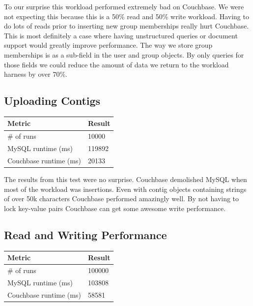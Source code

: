 \documentclass[]{IEEEtran}
\begin{document}
To our surprise this workload performed extremely bad on Couchbase. We were not expecting this because this is a 50\% read
and 50\% write workload. Having to do lots of reads prior to inserting new group memberships really hurt Couchbase. This is most definitely 
a case where having unstructured queries or document support would greatly improve performance. The way we store group memberships
is as a sub-field in the user and group objects. By only queries for those fields we could reduce the amount of data we return to the workload harness by over 70\%.

\subsection{Uploading Contigs}

\begin{center}
\begin{tabular}{|l|l|}
	\hline
	{\bf Metric} & {\bf Result} \\
	\hline
        \# of runs & 10000 \\
        \hline
        MySQL runtime (ms) & 119892 \\
	\hline
        Couchbase runtime (ms) & 20133 \\
        \hline
\end{tabular}
\end{center}

The results from this test were no surprise. Couchbase demolished MySQL when most of the workload was insertions. Even with
contig objects containing strings of over 50k characters Couchbase performed amazingly well. By not having to lock key-value pairs
Couchbase can get some awesome write performance.

\subsection{Read and Writing Performance}

\begin{center}
\begin{tabular}{|l|l|}
	\hline
	{\bf Metric} & {\bf Result} \\
	\hline
        \# of runs & 100000 \\
        \hline
        MySQL runtime (ms) & 103808 \\
	\hline
        Couchbase runtime (ms) & 58581 \\
        \hline
\end{tabular}
\end{center}
\end{document}

